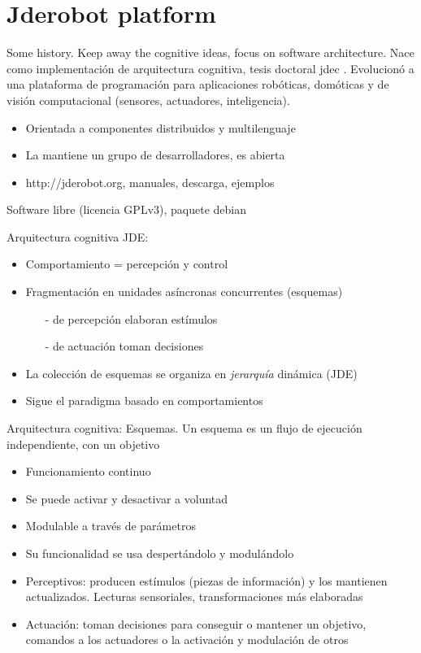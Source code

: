 \documentclass[twocolumn]{svjour3}          %
\begin{document}

\section{Jderobot platform}
\label{sec:jderobot}

Some history. Keep away the cognitive ideas, focus on software
architecture. Nace como implementación de arquitectura cognitiva,
tesis doctoral jdec \cite{canas02}. Evolucionó a una plataforma de programación para
aplicaciones robóticas, domóticas y de visión computacional (sensores,
actuadores, inteligencia).



\begin{itemize}
\item Orientada a componentes distribuidos y multilenguaje
\item La mantiene un grupo de desarrolladores, es abierta
\item {http://jderobot.org}, manuales, descarga, ejemplos
\end{itemize}
Software libre (licencia GPLv3), paquete debian


Arquitectura cognitiva JDE:
\begin{itemize}
\item Comportamiento = {percepción} y {control}
\item Fragmentación en unidades asíncronas concurrentes (esquemas)
\begin{itemize}
\item[-] de percepción elaboran estímulos
\item[-] de actuación toman decisiones
\end{itemize}
\item La colección de esquemas se organiza en \textit{jerarquía} dinámica (JDE)
\item Sigue el paradigma basado en comportamientos
\end{itemize}

Arquitectura cognitiva: Esquemas.
Un {esquema} es un flujo de ejecución independiente, con un objetivo
\begin{itemize}
\item Funcionamiento continuo
\item Se puede activar y desactivar a voluntad
\item Modulable a través de parámetros
\item Su funcionalidad se usa despertándolo y modulándolo
\item {Perceptivos}: producen estímulos (piezas de información) y los mantienen actualizados. Lecturas sensoriales, transformaciones más elaboradas 
\item {Actuación}: toman decisiones para conseguir o mantener un objetivo, comandos a los actuadores o la activación y modulación de otros 
\end{itemize}
\end{document}
